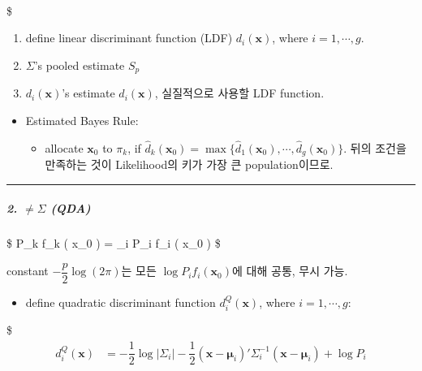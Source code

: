 \documentclass[
]{book}
\providecommand{\tightlist}{%
  \setlength{\itemsep}{0pt}\setlength{\parskip}{0pt}}
\begin{document}
{{{\begin{align*}
\end{align*}

\$

\begin{enumerate}
\def\labelenumi{\arabic{enumi}.}
\tightlist
\item
  define linear discriminant function (LDF) \(d_i (\pmb x)\), where \(i=1, \cdots, g\).
\item
  \(\Sigma\)'s pooled estimate \(S_p\)
\item
  \(d_i (\pmb x)\)'s estimate \(\hat d_i (\pmb x)\), 실질적으로 사용할 LDF function.
\end{enumerate}

\begin{itemize}
\tightlist
\item
  Estimated Bayes Rule:

  \begin{itemize}
  \tightlist
  \item
    allocate \(\pmb x_0\) to \(\pi_k\), if \(\hat d_k(\pmb x_0) = \max \{ \hat d_1(\pmb x_0), \cdots, \hat d_g(\pmb x_0) \}\). 뒤의 조건을 만족하는 것이 Likelihood의 키가 가장 큰 population이므로.
  \end{itemize}
\end{itemize}

\begin{center}\rule{0.5\linewidth}{0.5pt}\end{center}

\hypertarget{not-sigma-qda}{%
\subparagraph{\texorpdfstring{2. \(\not = \Sigma\) (QDA)}{2. \textbackslash not = \textbackslash Sigma (QDA)}}\label{not-sigma-qda}}

\$
\log P\_k f\_k ( \pmb x\_0 ) = \max\_i \log P\_i f\_i ( \pmb x\_0 )
\$

constant \(-\dfrac{p}{2} \log(2 \pi)\)는 모든 \(\log P_i f_i (\pmb x_0)\)에 대해 공통, 무시 가능.

\begin{itemize}
\tightlist
\item
  define quadratic discriminant function \(d_i^Q (\pmb x)\), where \(i=1, \cdots, g\):
\end{itemize}

\$
\begin{align*}

d_i^Q (\pmb x) &= -\dfrac{1}{2} \log\vert\Sigma_i \vert -\dfrac{1}{2} (\pmb x - \pmb \mu_i)' \Sigma_i^{-1} (\pmb x - \pmb \mu_i) +\log P_i \\

\\


\end{align*}}}}
\end{document}
